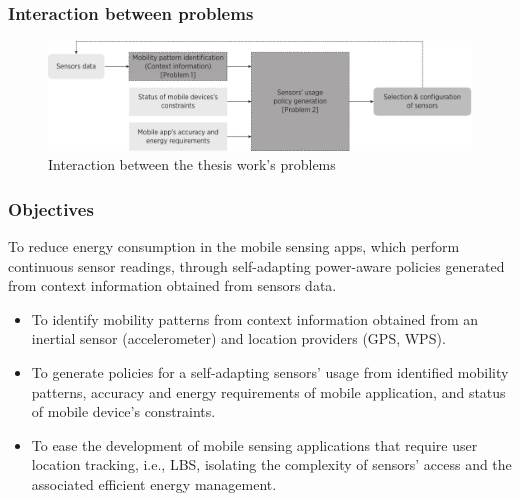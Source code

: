 \documentclass[compress,9pt,xcolor={dvipsnames,table}]{beamer}
\begin{document}
\begin{frame}\frametitle{Interaction between problems}
\begin{figure}[tb]
  \centering
  \includegraphics[width=\textwidth]{../../../resources/images/vectors/problems-incorporation}
  \caption{Interaction between the thesis work's problems}
  \label{fig:probems-incorporation}
\end{figure}
\end{frame}

\begin{frame}\frametitle{Objectives}
\begin{tcolorbox}[title=Main objective,colframe=PineGreen]
To reduce energy consumption in the mobile sensing apps, which perform continuous sensor readings, through self-adapting power-aware policies generated from context information obtained from sensors data.
\end{tcolorbox}

\begin{tcolorbox}[title=Particular objectives,colframe=PineGreen]
\small
\begin{itemize}
  \item To identify mobility patterns from context information obtained from an inertial sensor (accelerometer) and location providers (GPS, WPS).
  \item To generate policies for a self-adapting sensors' usage from identified mobility patterns, accuracy and energy requirements of mobile application, and status of mobile device's constraints. 
  \item To ease the development of mobile sensing applications that require user location tracking, i.e., LBS, isolating the complexity of sensors' access and the associated efficient energy management.
\end{itemize}
\end{tcolorbox}
\end{frame}
\end{document}
